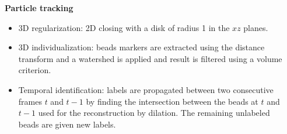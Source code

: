 \documentclass[final,svgnames,dvipsnames,table]{beamer}
\begin{document}
\begin{frame}[fragile]
\begin{columns}[t,totalwidth=\textwidth]
\begin{column}{0.32\textwidth}
\begin{block}{\bf Particle tracking}
\begin{itemize}
\begin{figure}
\label{fig:seg1}
\end{figure}
        \item 3D regularization: 2D closing with a disk of radius 1 in the $xz$ planes.
        \item 3D individualization: beads markers are extracted using the distance transform and a watershed is applied and result is filtered using a volume criterion.
        \item Temporal identification: labels are propagated between two consecutive frames $t$ and $t-1$ by finding the intersection between the beads at $t$ and $t-1$ used for the reconstruction by dilation. The remaining unlabeled beads are given new labels.
      \end{itemize}
     

    \end{block}
    \end{column}
    \begin{column}{0.32\textwidth}
%
%
%          
%

\end{column}
\end{columns}
\end{frame}
\end{document}
